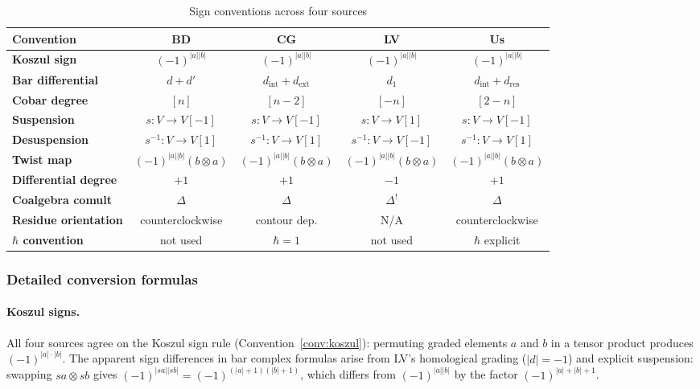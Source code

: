 \begin{table}[H]
\centering
\caption{Sign conventions across four sources}
\label{tab:master-comparison-signs}
\renewcommand{\arraystretch}{1.6}
\footnotesize
\begin{tabular}{|l|c|c|c|c|}
\hline
\textbf{Convention} & \textbf{BD} & \textbf{CG} & \textbf{LV} & \textbf{Us} \\
\hline
\hline
\textbf{Koszul sign} & $(-1)^{|a||b|}$ & $(-1)^{|a||b|}$ & $(-1)^{|a||b|}$ & $(-1)^{|a||b|}$ \\
\hline
\textbf{Bar differential} & $d + d'$ & $d_{\text{int}} + d_{\text{ext}}$ & $d_1$ & $d_{\text{int}} + d_{\text{res}}$ \\
\hline
\textbf{Cobar degree} & $[n]$ & $[n-2]$ & $[-n]$ & $[2-n]$ \\
\hline
\textbf{Suspension} & $s: V \to V[-1]$ & $s: V \to V[-1]$ & $s: V \to V[1]$ & $s: V \to V[-1]$ \\
\hline
\textbf{Desuspension} & $s^{-1}: V \to V[1]$ & $s^{-1}: V \to V[1]$ & $s^{-1}: V \to V[-1]$ & $s^{-1}: V \to V[1]$ \\
\hline
\textbf{Twist map} & $(-1)^{|a||b|}(b \otimes a)$ & $(-1)^{|a||b|}(b \otimes a)$ & $(-1)^{|a||b|}(b \otimes a)$ & $(-1)^{|a||b|}(b \otimes a)$ \\
\hline
\textbf{Differential degree} & $+1$ & $+1$ & $-1$ & $+1$ \\
\hline
\textbf{Coalgebra comult} & $\Delta$ & $\Delta$ & $\Delta^!$ & $\Delta$ \\
\hline
\textbf{Residue orientation} & counterclockwise & contour dep. & N/A & counterclockwise \\
\hline
\textbf{$\hbar$ convention} & not used & $\hbar = 1$ & not used & $\hbar$ explicit \\
\hline
\end{tabular}
\end{table}

\subsubsection{Detailed conversion formulas}

\paragraph{Koszul signs.}

\begin{remark}
\label{rem:koszul-sign-all-conventions}
All four sources agree on the Koszul sign rule (Convention~\ref{conv:koszul}):
permuting graded elements $a$ and $b$ in a tensor product produces
$(-1)^{|a| \cdot |b|}$.
The apparent sign differences in bar complex formulas arise from
LV's homological grading ($|d| = -1$) and explicit suspension:
swapping $sa \otimes sb$ gives
$(-1)^{|sa||sb|} = (-1)^{(|a|+1)(|b|+1)}$, which differs from
$(-1)^{|a||b|}$ by the factor $(-1)^{|a|+|b|+1}$.
\end{remark}

